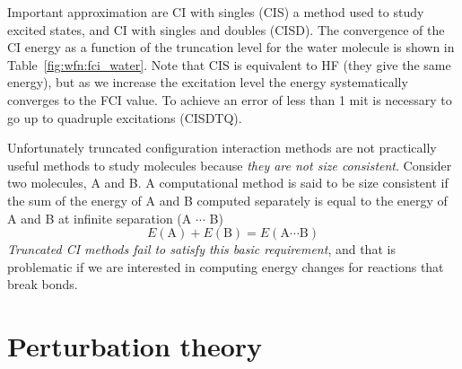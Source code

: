 \documentclass[../Main/notes.tex]{subfiles}
\begin{document}
Important approximation are CI with singles (CIS) a method used to study excited states, and CI with singles and doubles (CISD).
The convergence of the CI energy as a function of the truncation level for the water molecule is shown in Table~\ref{fig:wfn:fci_water}.
Note that CIS is equivalent to HF (they give the same energy), but as we increase the excitation level the energy systematically converges to the FCI value.
To achieve an error of less than 1 m\Eh it is necessary to go up to quadruple excitations (CISDTQ).


Unfortunately truncated configuration interaction methods are not practically useful methods to study molecules because \emph{they are not size consistent}.
Consider two molecules, A and B.
A computational method is said to be size consistent if the sum of the energy of A and B computed separately is equal to the energy of A and B at infinite separation (A $\cdots$ B)
\begin{equation}
\label{eq:wfn:size_consistency}
E(\text{A}) + E(\text{B}) = E(\text{A} \cdots \text{B}) 
\end{equation}
\emph{Truncated CI methods fail to satisfy this basic requirement}, and that is problematic if we are interested in computing energy changes for reactions that break bonds.

\section{Perturbation theory}
\end{document}
